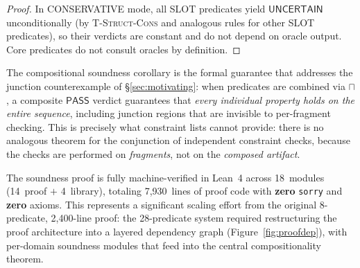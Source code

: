 \documentclass[acmsmall,review,anonymous]{acmart}
\newcommand{\PASS}{\ensuremath{\mathsf{PASS}}\xspace}
\newcommand{\UNCERTAIN}{\ensuremath{\mathsf{UNCERTAIN}}\xspace}
\begin{document}
\begin{proof}
In CONSERVATIVE mode, all SLOT predicates yield \UNCERTAIN{}
unconditionally (by \textsc{T-Struct-Cons} and analogous rules for
other SLOT predicates), so their verdicts are constant and do not
depend on oracle output.
Core predicates do not consult oracles by definition.
\end{proof}

\noindent The compositional soundness corollary is the formal
guarantee that addresses the junction counterexample of
\S\ref{sec:motivating}: when predicates are combined via $\sqcap$,
a composite \PASS{} verdict guarantees that \emph{every individual
property holds on the entire sequence}, including junction regions
that are invisible to per-fragment checking.
This is precisely what constraint lists cannot provide: there is no
analogous theorem for the conjunction of independent constraint checks,
because the checks are performed on \emph{fragments}, not on the
\emph{composed artifact}.

The soundness proof is fully machine-verified in Lean~4 across
18~modules (14~proof $+$ 4~library), totaling 7,930~lines of proof
code with \textbf{zero} \texttt{sorry} and \textbf{zero} axioms.
This represents a significant scaling effort from the original 8-predicate,
2,400-line proof: the 28-predicate system required restructuring the
proof architecture into a layered dependency graph
(Figure~\ref{fig:proofdep}), with per-domain soundness modules that
feed into the central compositionality theorem.
\end{document}
